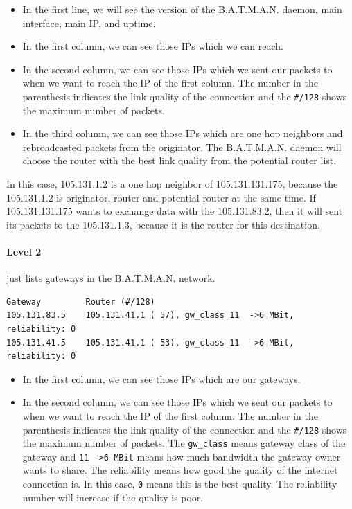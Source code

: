 \documentclass[
	12pt,
	a4paper,
	twoside,
	english,
	headsepline,
	footnosepline,
	automark,
	normalheadings,
	openany,
	cleardoubleplain,
	abstracton,
	idxtotoc,
	liststotoc,
	bibtotoc,
 	BCOR8mm,
]{scrartcl}
\begin{document}
\begin{itemize}
\item In the first line, we will see the version of the B.A.T.M.A.N. daemon, main interface, main  IP, and uptime.
\item In the first column, we can see those IPs which we can reach.
\item In the second column, we can see those IPs which we sent our packets to when we  want to reach the IP of the first column. The number in the parenthesis indicates the  link quality of the connection and the \verb|#/128| shows the maximum number of packets.
\item In the third column, we can see those IPs which are one hop neighbors and  rebroadcasted packets from the originator. The B.A.T.M.A.N. daemon will choose the router  with the best link quality from the potential router list.
\end{itemize}

In this case, 105.131.1.2 is a one hop neighbor of 105.131.131.175, because the 105.131.1.2  is  originator, router and potential router at the same time. If 105.131.131.175 wants to exchange  data with the 105.131.83.2, then it will sent its packets to the 105.131.1.3, because it is the  router for this destination.

\paragraph*{Level 2}
just lists gateways in the B.A.T.M.A.N. network.

\begin{lstlisting}[basicstyle=\footnotesize,	frame=single, columns= flexible]
Gateway         Router (#/128)
105.131.83.5    105.131.41.1 ( 57), gw_class 11  ->6 MBit, reliability: 0
105.131.41.5    105.131.41.1 ( 53), gw_class 11  ->6 MBit, reliability: 0
\end{lstlisting}

\begin{itemize}
\item In the first column, we can see those IPs  which are our gateways.
\item In the second column, we can see those IPs which we sent our packets to when we  want to reach the IP of the first column. The number in the parenthesis indicates the  link quality of the connection and the \verb|#/128| shows the maximum number of packets.  The \verb|gw_class| means gateway class of the gateway and \verb|11 ->6 MBit| means how  much bandwidth the gateway owner wants to share. The reliability means how good  the quality of the internet connection is. In this case, \verb|0| means this is the best  quality. The reliability number will increase if the quality is poor.
\end{itemize}
\end{document}
